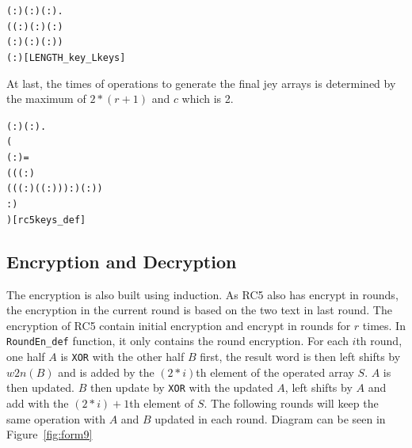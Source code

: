 \documentclass{article}
\begin{document}
\begin{alltt}
\HOLTokenTurnstile{} \HOLSymConst{\HOLTokenForall{}}( :) ( :) ( :).
     (( :)\HOLSymConst{,}( :)\HOLSymConst{,}( : )\HOLSymConst{,}
      ( : )\HOLSymConst{,}( :)\HOLSymConst{,}( :)) \HOLSymConst{=}
         \HOLSymConst{\HOLTokenImp{}}
       \HOLSymConst{=} ( :)\hfill{[LENGTH_key_Lkeys]}
\end{alltt}

At last, the times of operations to generate the final jey arrays is determined by the maximum of $2*(r+1)$ and
$c$ which is 2.

\begin{alltt}
\HOLTokenTurnstile{} \HOLSymConst{\HOLTokenForall{}}( :) ( :).
        \HOLSymConst{=}
     (
        ( :) =
          ((( :) \HOLSymConst{\HOLTokenProd{}}
             ((( :) \HOLSymConst{\HOLTokenProd{}} ( \HOLSymConst{\ensuremath{+}} ( :))) :) ( :))
             :)
           )\hfill{[rc5keys_def]}
\end{alltt}

\subsection{Encryption and Decryption}
The encryption is also built using induction. As RC5 also has encrypt in rounds, the encryption in the current round is
based on the two text in last round. The encryption of RC5 contain initial encryption and encrypt in rounds for $r$ times.
In \verb|RoundEn_def| function, it only contains the round encryption. For each $i$th round, one half $A$ is \verb|XOR| with
the other half $B$ first, the result word is then left shifts by $w2n(B)$ and is added by the $(2*i)$th element of the
operated array $S$. $A$ is then updated. $B$ then update by \verb|XOR| with the updated $A$, left shifts by $A$ and add with
the $(2*i)+1$th element of $S$. The following rounds will keep the same operation with $A$ and $B$ updated in each round. Diagram
can be seen in Figure~\ref{fig:form9}
\end{document}
